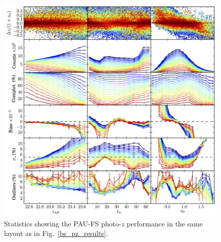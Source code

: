 \begin{figure}
\includegraphics[type=jpg,ext=.jpg,read=.jpg, width=130mm]{./plots/mock.r260.n1e6.s10.121027_default_faint}
\caption{Statistics showing the PAU-FS photo-$z$ performance in the same layout as in Fig.~\ref{bs_pz_results}.}
\label{fs_pz_results}
\end{figure}

